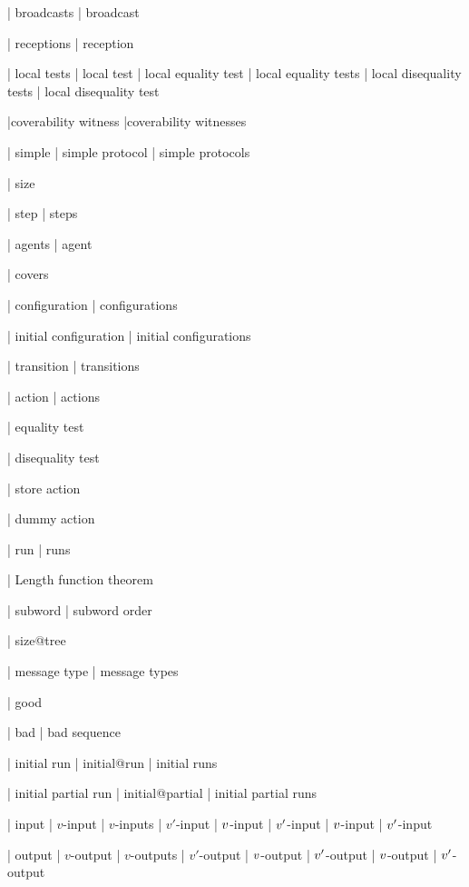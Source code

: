 | broadcasts
| broadcast

| receptions
| reception

| local tests
| local test
| local equality test
| local equality tests
| local disequality tests
| local disequality test

|coverability witness
|coverability witnesses

| simple
| simple protocol
| simple protocols

| size

| step
| steps

| agents
| agent

| covers

| configuration
| configurations

| initial configuration
| initial configurations

| transition
| transitions

| action
| actions

| equality test

| disequality test

| store action

| dummy action


| run
| runs

| Length function theorem

| subword 
| subword order


| size@tree 

| message type
| message types

| good

| bad
| bad sequence

| initial run
| initial@run
| initial runs

| initial partial run
| initial@partial
| initial partial runs

| input
| $v$-input
| $v$-inputs
| $v'$-input
| $v$-input
| $v'$-input
| $v$-input
| $v'$-input

| output
| $v$-output
| $v$-outputs
| $v'$-output
| $v$-output
| $v'$-output
| $v$-output
| $v'$-output

